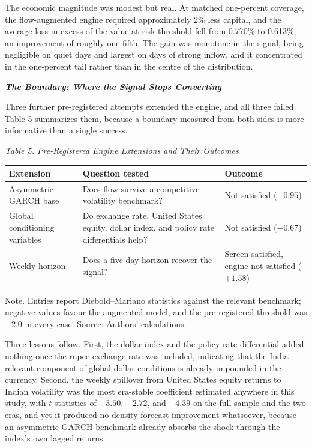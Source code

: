 \documentclass[12pt]{article}
\begin{document}
The economic magnitude was modest but real. At matched one-percent coverage,
the flow-augmented engine required approximately 2\% less capital, and the
average loss in excess of the value-at-risk threshold fell from 0.770\% to
0.613\%, an improvement of roughly one-fifth. The gain was monotone in the
signal, being negligible on quiet days and largest on days of strong inflow,
and it concentrated in the one-percent tail rather than in the centre of the
distribution.

\textbf{\emph{The Boundary: Where the Signal Stops Converting}}

Three further pre-registered attempts extended the engine, and all three
failed. Table 5 summarizes them, because a boundary measured from both sides
is more informative than a single success.

\begin{table}[htbp]
\centering
\emph{Table 5. Pre-Registered Engine Extensions and Their Outcomes}
\vspace{0.3\baselineskip}
\begin{singlespace}
\begin{tabular}{p{2.1in}p{1.5in}p{1.6in}}
\toprule
Extension & Question tested & Outcome \\
\midrule
Asymmetric GARCH base &
Does flow survive a competitive volatility benchmark? &
Not satisfied ($-0.95$) \\
Global conditioning variables &
Do exchange rate, United States equity, dollar index, and policy rate
differentials help? &
Not satisfied ($-0.67$) \\
Weekly horizon &
Does a five-day horizon recover the signal? &
Screen satisfied, engine not satisfied ($+1.58$) \\
\bottomrule
\end{tabular}
\end{singlespace}
\vspace{0.3\baselineskip}
\begin{singlespace}
\RaggedRight
Note. Entries report Diebold--Mariano statistics against the
relevant benchmark; negative values favour the augmented model, and the
pre-registered threshold was $-2.0$ in every case. Source: Authors'
calculations.
\end{singlespace}
\end{table}

Three lessons follow. First, the dollar index and the policy-rate differential
added nothing once the rupee exchange rate was included, indicating that the
India-relevant component of global dollar conditions is already impounded in
the currency. Second, the weekly spillover from United States equity returns
to Indian volatility was the most era-stable coefficient estimated anywhere in
this study, with $t$-statistics of $-3.50$, $-2.72$, and $-4.39$ on the full
sample and the two eras, and yet it produced no density-forecast improvement
whatsoever, because an asymmetric GARCH benchmark already absorbs the shock
through the index's own lagged returns.
\end{document}
